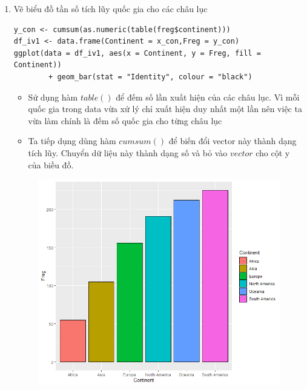\documentclass[a4paper]{article}
\theoremstyle{definition}
\begin{document}
\begin{enumerate}[i)]
\begin{enumerate}[1)]
    \item Vẽ biểu đồ tần số tích lũy quốc gia cho các châu lục
    \lstset{
    title=Source code}
\begin{lstlisting}[frame=single]  
y_con <- cumsum(as.numeric(table(freg$continent)))
df_iv1 <- data.frame(Continent = x_con,Freg = y_con)
ggplot(data = df_iv1, aes(x = Continent, y = Freg, fill = Continent)) 
        + geom_bar(stat = "Identity", colour = "black")
\end{lstlisting}
\begin{itemize}
    \item Sử dụng hàm $table()$ để đếm số lần xuất hiện của các châu lục. Vì mỗi quốc gia trong data vừa xử lý chỉ xuất hiện duy nhất một lần nên việc ta vừa làm chính là đếm số quốc gia cho từng châu lục
    \item Ta tiếp dụng dùng hàm $cumsum()$ để biến đổi vector này thành dạng tích lũy. Chuyển dữ liệu này thành dạng số và bỏ vào $vector$ cho cột y của biều đồ.
\end{itemize}
\begin{figure}[h!]
	\begin{center}
        \includegraphics[scale=0.8]{Images/IV/iv (1).png}
	\end{center}
\end{figure}


\end{enumerate}
\end{enumerate}
\end{document}
